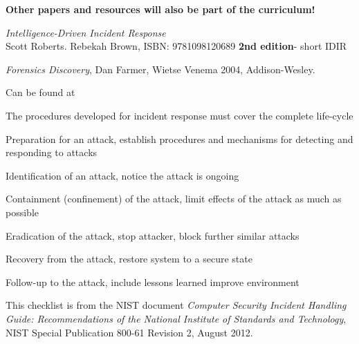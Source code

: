 \documentclass[Screen16to9,17pt]{foils}
\begin{document}
{\bf Other papers and resources will also be part of the curriculum!}



\emph{Intelligence-Driven Incident Response} \\
  Scott Roberts. Rebekah Brown, ISBN: 9781098120689 {\bf 2nd edition}- short IDIR



\emph{Forensics Discovery}, Dan Farmer, Wietse Venema 2004, Addison-Wesley.

Can be found at 






The procedures developed for incident response must cover the complete life-cycle

\begin{list2}
\item  Preparation for an attack, establish procedures and mechanisms for detecting and responding to attacks
\item  Identification of an attack, notice the attack is ongoing
\item  Containment (confinement) of the attack, limit effects of the attack as much as possible
\item  Eradication of the attack, stop attacker, block further similar attacks
\item  Recovery from the attack, restore system to a secure state
\item  Follow-up to the attack, include lessons learned  improve environment
\end{list2}


This checklist is from the NIST document
\emph{Computer Security Incident Handling Guide: Recommendations of the National Institute
of Standards and Technology}, NIST Special Publication 800-61
Revision 2, August 2012.


\end{document}
